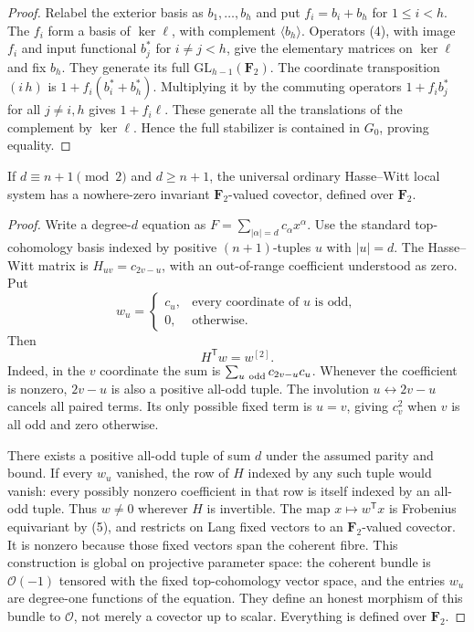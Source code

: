 \begin{proof}
Relabel the exterior basis as $b_1,\ldots,b_h$ and put
$f_i=b_i+b_h$ for $1\leq i<h$.
The $f_i$ form a basis of $\ker\ell$, with complement
$\langle b_h\rangle$.  Operators (4), with image $f_i$ and
input functional $b_j^*$ for $i\ne j<h$, give the elementary
matrices on $\ker\ell$ and fix $b_h$.  They generate its
full $\mathrm{GL}_{h-1}(\mathbf F_2)$.
The coordinate transposition $(i\,h)$ is
$1+f_i(b_i^*+b_h^*)$.  Multiplying it by the commuting
operators $1+f_i b_j^*$ for all $j\ne i,h$ gives
$1+f_i\ell$.  These generate all the translations of the
complement by $\ker\ell$.  Hence the full stabilizer is
contained in $G_0$, proving equality.
\end{proof}

\begin{lemma}\label{lem:pn-char2-canonical-covector}
If $d\equiv n+1\pmod2$ and $d\geq n+1$, the universal ordinary
Hasse--Witt local system has a nowhere-zero invariant
$\mathbf F_2$-valued covector, defined over $\mathbf F_2$.
\end{lemma}

\begin{proof}
Write a degree-$d$ equation as $F=\sum_{|\alpha|=d}c_\alpha x^\alpha$.
Use the standard top-cohomology basis indexed by positive
$(n+1)$-tuples $u$ with $|u|=d$.  The Hasse--Witt matrix is
$H_{uv}=c_{2v-u}$, with an out-of-range coefficient understood
as zero.  Put
\[
 w_u=\begin{cases}c_u,&\text{every coordinate of }u\text{ is odd},\\
                   0,&\text{otherwise}.\end{cases}
\]
Then
\[
 H^{\mathsf T}w=w^{[2]}.
 \tag{5}
\]
Indeed, in the $v$ coordinate the sum is
$\sum_{u\ {\rm odd}}c_{2v-u}c_u$.  Whenever the coefficient
is nonzero, $2v-u$ is also a positive all-odd tuple.
The involution $u\leftrightarrow2v-u$ cancels all paired
terms.  Its only possible fixed term is $u=v$, giving
$c_v^2$ when $v$ is all odd and zero otherwise.

There exists a positive all-odd tuple of sum $d$ under the
assumed parity and bound.  If every $w_u$ vanished, the row
of $H$ indexed by any such tuple would vanish: every
possibly nonzero coefficient in that row is itself indexed
by an all-odd tuple.  Thus $w\ne0$ wherever $H$ is invertible.
The map $x\mapsto w^{\mathsf T}x$ is Frobenius equivariant
by (5), and restricts on Lang fixed vectors to an
$\mathbf F_2$-valued covector.  It is nonzero because those
fixed vectors span the coherent fibre.
This construction is global on projective parameter space:
the coherent bundle is $\mathcal O(-1)$ tensored with the
fixed top-cohomology vector space, and the entries $w_u$
are degree-one functions of the equation.  They define an
honest morphism of this bundle to $\mathcal O$, not merely
a covector up to scalar.  Everything is defined over
$\mathbf F_2$.
\end{proof}

